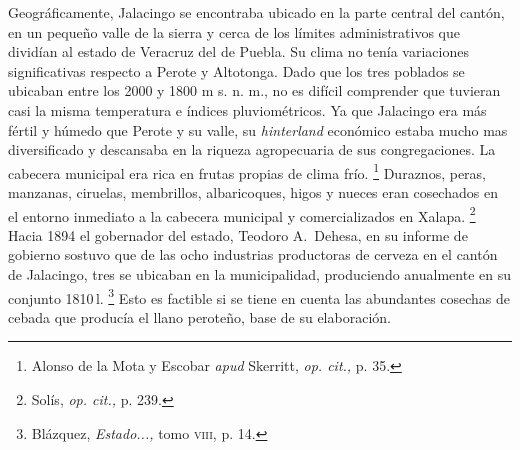 \documentclass[14pt,twoside,final]{extbook} %
\let\oldfootnote\footnote
\renewcommand\footnote[1]{%
\oldfootnote{\hspace{1mm}#1}}
\begin{document}
Geográficamente, Jalacingo se encontraba ubicado en la parte central del cantón, en un pequeño valle de la sierra y cerca de los límites administrativos que dividían al estado de Veracruz del de Puebla. Su clima no tenía variaciones significativas respecto a Perote y Altotonga. Dado que los tres poblados se ubicaban entre los 2000 y 1800 m s. n. m., no es difícil comprender que tuvieran casi la misma temperatura e índices pluviométricos. Ya que Jalacingo era más fértil y húmedo que Perote y su valle, su \emph{hinterland} económico estaba mucho mas diversificado y descansaba en la riqueza agropecuaria de sus congregaciones. La cabecera municipal era rica en frutas propias de clima frío.\footnote{Alonso de la Mota y Escobar \emph{apud} Skerritt, \emph{op. cit.,} p. 35.} Duraznos, peras, manzanas, ciruelas, membrillos, albaricoques, higos y nueces eran cosechados en el entorno inmediato a la cabecera municipal y comercializados en Xalapa.\footnote{Solís, \emph{op. cit.,} p. 239.} Hacia 1894 el gobernador del estado, Teodoro A.~Dehesa, en su informe de gobierno sostuvo que de las ocho industrias productoras de cerveza en el cantón de Jalacingo, tres se ubicaban en la municipalidad, produciendo anualmente en su conjunto 1810\,l.\footnote{Blázquez, \emph{Estado...,} tomo \textsc{viii}, p. 14.} Esto es factible si se tiene en cuenta las abundantes cosechas de cebada que producía el llano peroteño, base de su elaboración.
\end{document}
